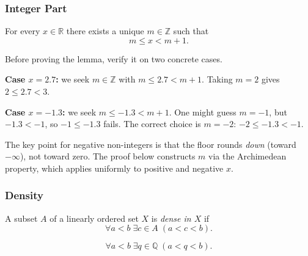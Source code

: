 
\subsubsection{Integer Part}

\begin{lemma}
\label{lem:floor-lemma}
For every $x \in \mathbb{R}$ there exists a unique $m \in \mathbb{Z}$ such that
\[
m \le x < m + 1.
\]
\end{lemma}

\begin{remark*}
Before proving the lemma, verify it on two concrete cases.

\medskip
\textbf{Case $x = 2.7$:} we seek $m \in \mathbb{Z}$ with $m \le 2.7 < m+1$.
Taking $m = 2$ gives $2 \le 2.7 < 3$. \checkmark

\medskip
\textbf{Case $x = -1.3$:} we seek $m \le -1.3 < m+1$.
One might guess $m = -1$, but $-1.3 < -1$, so $-1 \le -1.3$ fails.
The correct choice is $m = -2$: $-2 \le -1.3 < -1$. \checkmark

The key point for negative non-integers is that the floor rounds \emph{down}
(toward $-\infty$), not toward zero.  The proof below constructs $m$ via the
Archimedean property, which applies uniformly to positive and negative $x$.
\end{remark*}




\subsubsection{Density}

\begin{tcolorbox}[colback=propbox, colframe=propborder, arc=2pt,
  left=6pt, right=6pt, top=4pt, bottom=4pt,
  title={\small\textbf{Definition}},
  fonttitle=\small\bfseries]
A subset $A$ of a linearly ordered set $X$ is \emph{dense in $X$} if
\[
\forall a < b\; \exists c \in A\; (a < c < b).
\]
\end{tcolorbox}

\begin{remark*}
\[
\forall a < b\; \exists q \in \mathbb{Q}\; (a < q < b).
\]
\end{remark*}

